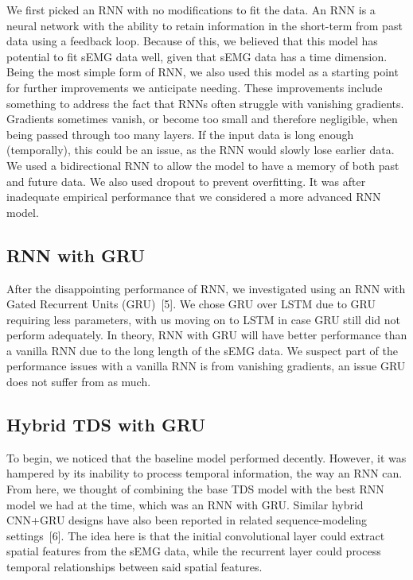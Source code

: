 \documentclass{article}
\begin{document}
We first picked an RNN with no modifications to fit the data.
An RNN is a neural network with the ability to retain information in the short-term
from past data using a feedback loop.
Because of this, we believed that this model has potential to fit sEMG data well,
given that sEMG data has a time dimension.
Being the most simple form of RNN, we also used this model as a starting point for
further improvements we anticipate needing.
These improvements include something to address the fact that RNNs often struggle
with vanishing gradients.
Gradients sometimes vanish, or become too small and therefore negligible, when being
passed through too many layers.
If the input data is long enough (temporally), this could be an issue, as the RNN
would slowly lose earlier data.
We used a bidirectional RNN to allow the model to have a memory of both past and future data.
We also used dropout to prevent overfitting.
It was after inadequate empirical performance that we considered a more advanced RNN model.

\subsection{RNN with GRU}

After the disappointing performance of RNN, we investigated using an RNN with
Gated Recurrent Units (GRU)~[5].
We chose GRU over LSTM due to GRU requiring less parameters, with us moving on to
LSTM in case GRU still did not perform adequately.
In theory, RNN with GRU will have better performance than a vanilla RNN due to the
long length of the sEMG data.
We suspect part of the performance issues with a vanilla RNN is from vanishing
gradients, an issue GRU does not suffer from as much.

\subsection{Hybrid TDS with GRU}

To begin, we noticed that the baseline model performed decently.
However, it was hampered by its inability to process temporal information, the way an RNN can.
From here, we thought of combining the base TDS model with the best RNN model we had
at the time, which was an RNN with GRU\@. Similar hybrid CNN+GRU designs have also been
reported in related sequence-modeling settings~[6]. The idea here is that the initial convolutional layer could extract
spatial features from the sEMG data, while the recurrent layer could process temporal relationships between said spatial features.
\end{document}
